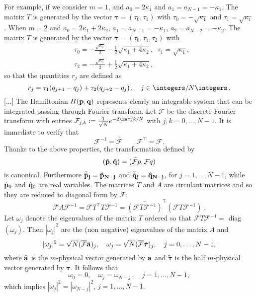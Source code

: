 {For  example,  if  we consider $m=1$, and $a_0=2\kappa_1$ and
$a_1=a_{N-1}=-\kappa_1$.  The matrix $T$ is generated by the vector
${\boldsymbol{\tau}}=(\tau_0,\tau_1)$ with $\tau_0=-\sqrt{\kappa_1}$ and
$\tau_1= \sqrt{\kappa_1}$.
When $m=2$ and  $a_0=2\kappa_1+2\kappa_2$,  $a_1=a_{N-1}=-\kappa_1$,  $a_2=a_{N-2}=-\kappa_2$. The matrix $T$ is generated by the vector ${\boldsymbol{\tau}}=(\tau_0,\tau_1,\tau_2)$
with
\begin{align*}
&\tau_0=- \frac{\sqrt{\kappa_1}}{2}-\frac{1}{2}\sqrt{\kappa_1+4\kappa_2}, \;\;\tau_1=\sqrt{\kappa_1},\\
&\tau_2=-\frac{\sqrt{\kappa_1}}{2}+\frac{1}{2}\sqrt{\kappa_1+4\kappa_2},\end{align*}
so that the quantities $r_j$ are defined as
\[
r_j=\tau_1(q_{j+1}-q_j)+\tau_2 (q_{j+2}-q_j)\,,\quad j\in\integers / N\integers \,.
\]
[...]
The Hamiltonian $H({\bf{p}},{\bf{q}})$	represents clearly an integrable system  that can be integrated passing through Fourier transform.
Let ${\mathcal F}$ be the discrete Fourier transform with entries  ${\mathcal F}_{j,k}:=
\frac{1}{\sqrt{N}} e^{- 2\im \pi j k/N}$ with $j,k=0,\dots, N-1$. It is immediate to verify that
	\begin{equation}
	\label{GKMM21:DHT_prop}
	{\mathcal F}^{-1} = \bar{{\mathcal F}} \qquad {\mathcal F}^\intercal = {\mathcal F}.
	\end{equation}
	Thanks to the above  properties,  the transformation defined by
	\begin{equation}
	\label{GKMM21:eq:F_variables}
	(\hat{\bf{p}}, \hat{\bf{q}}) = (\bar{\mathcal F} p, {\mathcal F} q)
	\end{equation}
	is canonical.  Furthermore
$\bar{\hat{\bf{p}}}_j = \hat{\bf{p}}_{N-j}$  and $\bar{\hat{\bf{q}}}_j = \hat{\bf{q}}_{N-j}$,
for $j=1,\dots,N-1$, while  $\hat{\bf{p}}_0$ and  $\hat{\bf{q}}_0$ are real variables.
The matrices  $T$ and $A$ are  circulant matrices and so they are reduced to diagonal form by
${\mathcal F}$:
\[
{\mathcal F} A {\mathcal F}^{-1}
= {\mathcal F} T^\intercal T{\mathcal F}^{-1}
=\overline{({\mathcal F} T{\mathcal F}^{-1})}^\intercal ({\mathcal F} T{\mathcal F}^{-1})
\;.
\]
Let  $\omega_j$ denote the eigenvalues of the matrix $T$ ordered so that
${\mathcal F} T{\mathcal F}^{-1}=$ diag$(\omega_j)$. Then  $|\omega_j|^2$
are the (non negative) eigenvalues of the matrix $A$ and
\begin{equation}
\label{GKMM21:omega}
|\omega_j|^2=\sqrt{N}( \overline{ {\mathcal F}} \tilde{{\bf{a}}})_j,\quad \omega_j=\sqrt{N}( \overline{{\mathcal F}}\tilde{ \boldsymbol{\tau}})_j, \quad j=0,\dots, N-1,
\end{equation}
where  $\tilde{{\bf{a}}}$ is  the $m$-physical vector generated by
${\bf{a}}$ and  $ \tilde{\boldsymbol{\tau}}$ is the half $m$-physical
vector generated by $ \boldsymbol{\tau}$.
It follows that
  \begin{equation}
  \label{GKMM21:sym_omega}
\omega_0=0,\quad   \omega_j=\overline{\omega}_{N-j}\,,\quad j=1,\dots,N-1,
  \end{equation}
  which implies $|\omega_{j}|^2=|\omega_{N-j}|^2$, $j=1,\dots,N-1$.

}

